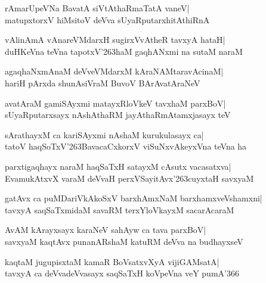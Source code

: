 \documentclass[twoside,12pt,openright]{book}
\def\S{\char'263}
\newcounter{shloka}[chapter]
\begin{document}
\begin{shloka}%
rAmarUpeVNa BavatA siVtAthaRmaTatA vaneV|\\
matupxtorxV hiMsitoV deVva sUyaRputarxhitAthiRnA
\end{shloka}

\begin{shloka}%
vAlinAmA vAnareVMdarxH sugirxVvAtheR tavxyA hataH|\\
duHKeVna teVna tapotxV\S haM gaqhANxmi na sutaM naraM
\end{shloka}

\begin{shloka}%
agaqhaNxmAnaM deVveVMdarxM kAraNAMtaravAcinaM|\\
hariH pArxda shunAsiVraM BuvoV BArAvatAraNeV
\end{shloka}

\begin{shloka}%
avatAraM gamiSAyxmi matayxRloVkeV tavxhaM parxBoV|\\
sUyaRputarxsayx nAshAthaRM jayAthaRmAtamxjasayx teV
\end{shloka}

\begin{shloka}%
sArathayxM ca kariSAyxmi nAshaM kurukulasayx ca|\\
tatoV haqSoTxV\S BavacaCxkorxV viSuNxvAkeyxVna teVna ha
\end{shloka}

\begin{shloka}%
parxtigaqhayx naraM haqSaTxH satayxM cAsutx vacasatxva|\\
EvamukAtxvX varaM deVvaH perxVSayitAvx\S cuyxtaH savxyaM
\end{shloka}

\begin{shloka}%
gatAvx ca puMDariVkAkoSxV barxhAmxNaM barxhamxveVshamxni|\\
tavxyA saqSaTxmidaM savaRM terxYloVkayxM sacarAcaraM
\end{shloka}

\begin{shloka}%
AvAM kArayxsayx karaNeV sahAyw ca tava parxBoV|\\
savxyaM kaqtAvx punanARshaM katuRM deVva na budhayxseV
\end{shloka}

\begin{shloka}%
kaqtaM jugupisxtaM kamaR BoVsatxvXyA vijiGAMsatA|\\
tavxyA ca deVvadeVvasayx saqSaTxH koVpeVna veY pumA\char'366
\end{shloka}
\end{document}
